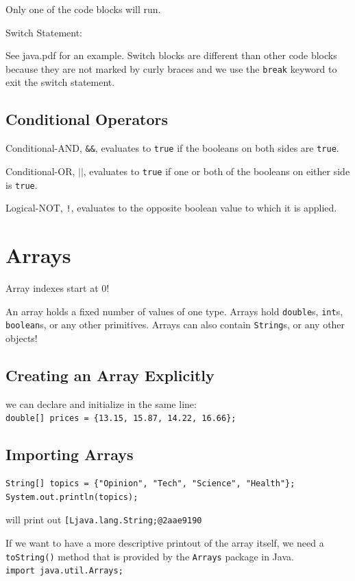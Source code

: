\documentclass[a4paper, 12pt]{article}
\begin{document}
Only one of the code blocks will run.

\vspace{1.3em}

Switch Statement:

See java.pdf for an example. Switch blocks are different than other code blocks because they are not marked by curly braces and we use the \verb|break| keyword to exit the switch statement.

\subsection{Conditional Operators}
Conditional-AND, \verb|&&|, evaluates to \verb|true| if the booleans on both sides are \verb|true|.

Conditional-OR, $\vert\vert$, evaluates to \verb|true| if one or both of the booleans on either side is \verb|true|.

Logical-NOT, \verb|!|, evaluates to the opposite boolean value to which it is applied.


\section{Arrays}
Array indexes start at 0!

An array holds a fixed number of values of one type. Arrays hold \verb|double|s, \verb|int|s, \verb|boolean|s, or any other primitives. Arrays can also contain \verb|String|s, or any other objects!

\subsection{Creating an Array Explicitly}
we can declare and initialize in the same line:\\
\verb|double[] prices = {13.15, 15.87, 14.22, 16.66};|

\subsection{Importing Arrays}
\begin{verbatim}
String[] topics = {"Opinion", "Tech", "Science", "Health"};
System.out.println(topics);
\end{verbatim}
will print out \verb|[Ljava.lang.String;@2aae9190|

If we want to have a more descriptive printout of the array itself, we need a \verb|toString()| method that is provided by the \verb|Arrays| package in Java.\\
\verb|import java.util.Arrays;|
\end{document}
